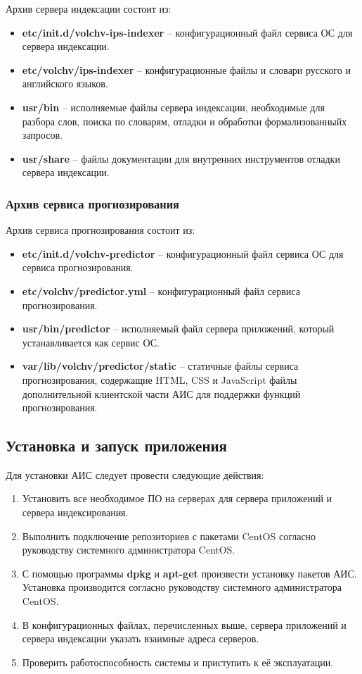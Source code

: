 Архив сервера индексации состоит из:
\begin{itemize}
\item \textbf{etc/init.d/volchv-ips-indexer} -- конфигурационный файл сервиса ОС для сервера индексации. 
\item \textbf{etc/volchv/ips-indexer} -- конфигурационные файлы и словари русского и английского языков.
\item \textbf{usr/bin} -- исполняемые файлы сервера индексации, необходимые для разбора слов, поиска по словарям, отладки и обработки формализованныйх запросов. 
\item \textbf{usr/share} -- файлы документации для внутренних инструментов отладки сервера индексации.
\end{itemize}

\subsubsection{Архив сервиса прогнозирования} \hfill

Архив сервиса прогнозирования состоит из:
\begin{itemize}
\item \textbf{etc/init.d/volchv-predictor} -- конфигурационный файл сервиса ОС для сервиса прогнозирования. 
\item \textbf{etc/volchv/predictor.yml} -- конфигурационный файл сервиса прогнозирования.
\item \textbf{usr/bin/predictor} -- исполняемый файл сервера приложений, который устанавливается как сервис ОС. 
\item \textbf{var/lib/volchv/predictor/static} -- статичные файлы сервиса прогнозирования, содержащие HTML, CSS и JavaScript файлы дополнительной клиентской части АИС для поддержки функций прогнозирования.
\end{itemize}

\subsection{Установка и запуск приложения}

Для установки АИС следует провести следующие действия:
\begin{enumerate}
\item Установить все необходимое ПО на серверах для сервера приложений и сервера индексирования.
\item Выполнить подключение репозиториев с пакетами CentOS согласно руководству системного администратора CentOS.
\item С помощью программы \textbf{dpkg} и \textbf{apt-get} произвести установку пакетов АИС. Установка производится согласно руководству системного администратора CentOS.
\item В конфигурационных файлах, перечисленных выше, сервера приложений и сервера индексации указать взаимные адреса серверов.
\item Проверить работоспособность системы и приступить к её эксплуатации.
\end{enumerate}
